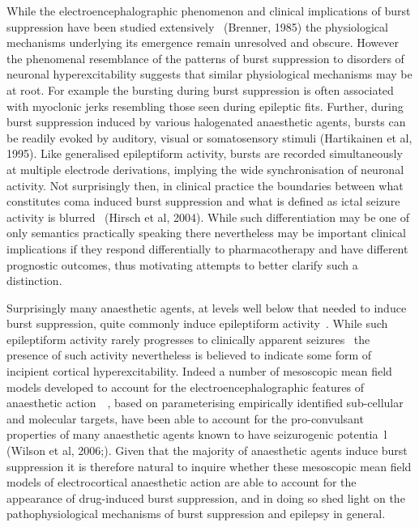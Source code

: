 \documentclass[a4paper,12pt]{article}
\begin{document}
While the electroencephalographic phenomenon and clinical
implications of burst suppression have been studied extensively~\cite{Niedermeyer2009}
(Brenner, 1985) the physiological mechanisms
underlying its emergence remain unresolved and obscure. However the
phenomenal resemblance of the patterns of burst suppression to
disorders of neuronal hyperexcitability suggests that similar
physiological mechanisms may be at root. For example the bursting
during burst suppression is often associated with myoclonic jerks
resembling those seen during epileptic fits. Further, during burst
suppression induced by various halogenated anaesthetic agents, bursts
can be readily evoked by auditory, visual or somatosensory stimuli
(Hartikainen et al, 1995). Like generalised epileptiform activity, bursts
are recorded simultaneously at multiple electrode derivations, implying
the wide synchronisation of neuronal activity. Not surprisingly then, in
clinical practice the boundaries between what constitutes coma
induced burst suppression and what is defined as ictal seizure activity
is blurred~\cite{Amzica2009} (Hirsch et al, 2004). While such
differentiation may be one of only semantics practically speaking there
nevertheless may be important clinical implications if they respond
differentially to pharmacotherapy and have different prognostic
outcomes, thus motivating attempts to better clarify such a
distinction.

Surprisingly many anaesthetic agents, at levels well below that needed
to induce burst suppression, quite commonly induce epileptiform
activity~\cite{Voss2008}. While such epileptiform activity rarely
progresses to clinically apparent seizures~\cite{GarciaMorales2009}
the presence of such activity nevertheless is believed to indicate some
form of incipient cortical hyperexcitability. Indeed a number of
mesoscopic mean field models developed to account for the
electroencephalographic features of anaesthetic action~\cite{Bojak2005}~\cite{SteynRoss1999}, based on parameterising empirically
identified sub-cellular and molecular targets, have been able to account
for the pro-convulsant properties of many anaesthetic agents known
to have seizurogenic potentia~\cite{Liley2005}l (Wilson et al, 2006;). Given that the majority of anaesthetic agents induce burst
suppression it is therefore natural to inquire whether these mesoscopic
mean field models of electrocortical anaesthetic action are able to
account for the appearance of drug-induced burst suppression, and in
doing so shed light on the pathophysiological mechanisms of burst
suppression and epilepsy in general.
\end{document}
